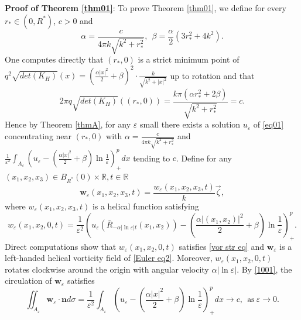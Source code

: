 \documentclass[12pt,reqno]{amsart}
\numberwithin{equation}{section}
\theoremstyle{definition}
\theoremstyle{remark}
\begin{document}
\textbf{Proof of Theorem \ref{thm01}}:
To prove Theorem \ref{thm01}, we define for every $ r_*\in (0,R^*) $, $ c>0 $ and
\begin{equation}\label{502}
\alpha=\frac{c}{4\pi k\sqrt{k^2+r_*^2}},\ \ \beta=\frac{\alpha}{2}(3r_*^2+4k^2).
\end{equation}
One computes directly that $ (r_*,0)$ is a strict minimum point of $ q^2\sqrt{det(K_H)}(x)=\left( \frac{\alpha|x|^2}{2}+\beta\right)^2\cdot \frac{k}{\sqrt{k^2+|x|^2}} $ up to rotation and that
\begin{equation*}
2\pi q\sqrt{det(K_H)}((r_*,0))=\frac{k\pi(\alpha r_*^2+2\beta)}{\sqrt{k^2+r_*^2}}=c.
\end{equation*}
Hence by Theorem \ref{thmA}, for any $ \varepsilon $ small there exists a solution $ u_\varepsilon $ of \eqref{eq01} concentrating near $ (r_*,0) $ with $ \alpha=\frac{c}{4\pi k\sqrt{k^2+r_*^2}} $ and $\frac{1}{\varepsilon^2} \int_{A_\varepsilon}\left( u_\varepsilon-\left( \frac{\alpha|x|^2}{2}+\beta\right)\ln\frac{1}{\varepsilon}\right)^p_+dx $ tending to $ c $. Define for any $ (x_1,x_2,x_3)\in B_{R^*}(0)\times\mathbb{R}, t\in\mathbb{R}  $
\begin{equation*}
\mathbf{w}_\varepsilon(x_1,x_2,x_3,t)= \frac{w_\varepsilon(x_1,x_2,x_3,t)}{k}\overrightarrow{\zeta},
\end{equation*}
where $ w_\varepsilon(x_1,x_2,x_3,t) $ is a helical function satisfying
\begin{equation}\label{503}
w_\varepsilon(x_1,x_2,0,t)=\frac{1}{\varepsilon^2}\left( u_\varepsilon(\bar{R}_{-\alpha|\ln\varepsilon| t}(x_1,x_2))-\left( \frac{\alpha|(x_1,x_2)|^2}{2}+\beta\right)\ln\frac{1}{\varepsilon}\right)^p_+.
\end{equation}
Direct computations show that $ w_\varepsilon(x_1,x_2,0,t) $ satisfies \eqref{vor str eq} and $ \mathbf{w}_\varepsilon $ is a left-handed helical vorticity field of \eqref{Euler eq2}. Moreover, $ w_\varepsilon(x_1,x_2,0,t) $ rotates clockwise around the origin with angular velocity $ \alpha|\ln\varepsilon| $. By \eqref{1001}, the circulation of $ \mathbf{w}_\varepsilon $ satisfies
\begin{equation*}
\iint_{A_\varepsilon}\mathbf{w}_\varepsilon\cdot\mathbf{n}d\sigma=\frac{1}{\varepsilon^2} \int_{A_\varepsilon}\left( u_\varepsilon-\left( \frac{\alpha|x|^2}{2}+\beta\right)\ln\frac{1}{\varepsilon}\right)^p_+dx\to c,\ \ \text{as}\ \varepsilon\to0.
\end{equation*}
\end{document}
